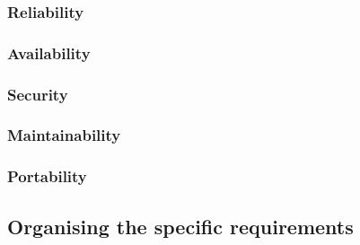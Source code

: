 \documentclass{article}
\begin{document}
\subsubsection{Reliability}

\subsubsection{Availability}

\subsubsection{Security}

\subsubsection{Maintainability}


\subsubsection{Portability}


\subsection{Organising the specific requirements}
\end{document}
